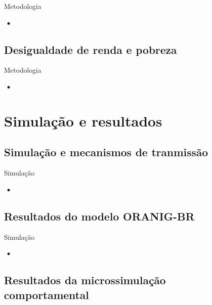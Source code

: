 \documentclass[10pt]{sintefbeamer}
\begin{document}
\begin{frame}{Metodologia}
	\begin{itemize}[<+->]
		\item 
	\end{itemize}
\end{frame}


\subsection{Desigualdade de renda e pobreza}

\begin{frame}{Metodologia}
	\begin{itemize}[<+->]
		\item 
	\end{itemize}
\end{frame}



\section{Simulação e resultados}

\subsection{Simulação e mecanismos de tranmissão}

\begin{frame}{Simulação}
	\begin{itemize}[<+->]
		\item 
	\end{itemize}
\end{frame}


\subsection{Resultados do modelo ORANIG-BR}

\begin{frame}{Simulação}
	\begin{itemize}[<+->]
		\item 
	\end{itemize}
\end{frame}


\subsection{Resultados da microssimulação comportamental}
\end{document}
